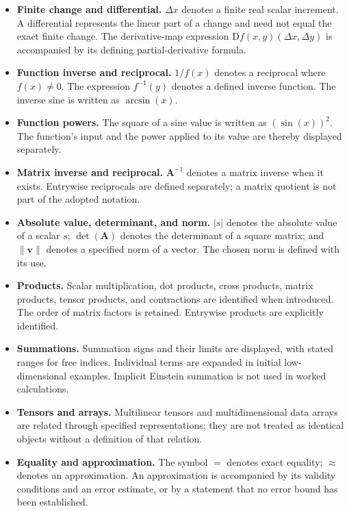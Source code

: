 \documentclass[11pt,oneside,openany]{book}
\begin{document}
\begin{itemize}
\item \textbf{Finite change and differential.} \(\Delta x\) denotes a finite real scalar increment. A differential represents the linear part of a change and need not equal the exact finite change. The derivative-map expression \(\mathrm Df(x,y)(\Delta x,\Delta y)\) is accompanied by its defining partial-derivative formula.
\item \textbf{Function inverse and reciprocal.} \(1/f(x)\) denotes a reciprocal where \(f(x)\ne0\). The expression \(f^{-1}(y)\) denotes a defined inverse function. The inverse sine is written as \(\arcsin(x)\).
\item \textbf{Function powers.} The square of a sine value is written as \((\sin(x))^2\). The function's input and the power applied to its value are thereby displayed separately.
\item \textbf{Matrix inverse and reciprocal.} \(\mathbf A^{-1}\) denotes a matrix inverse when it exists. Entrywise reciprocals are defined separately; a matrix quotient is not part of the adopted notation.
\item \textbf{Absolute value, determinant, and norm.} \(|s|\) denotes the absolute value of a scalar \(s\); \(\det(\mathbf A)\) denotes the determinant of a square matrix; and \(\lVert\mathbf v\rVert\) denotes a specified norm of a vector. The chosen norm is defined with its use.
\item \textbf{Products.} Scalar multiplication, dot products, cross products, matrix products, tensor products, and contractions are identified when introduced. The order of matrix factors is retained. Entrywise products are explicitly identified.
\item \textbf{Summations.} Summation signs and their limits are displayed, with stated ranges for free indices. Individual terms are expanded in initial low-dimensional examples. Implicit Einstein summation is not used in worked calculations.
\item \textbf{Tensors and arrays.} Multilinear tensors and multidimensional data arrays are related through specified representations; they are not treated as identical objects without a definition of that relation.
\item \textbf{Equality and approximation.} The symbol \(=\) denotes exact equality; \(\approx\) denotes an approximation. An approximation is accompanied by its validity conditions and an error estimate, or by a statement that no error bound has been established.

\end{itemize}
\end{document}
